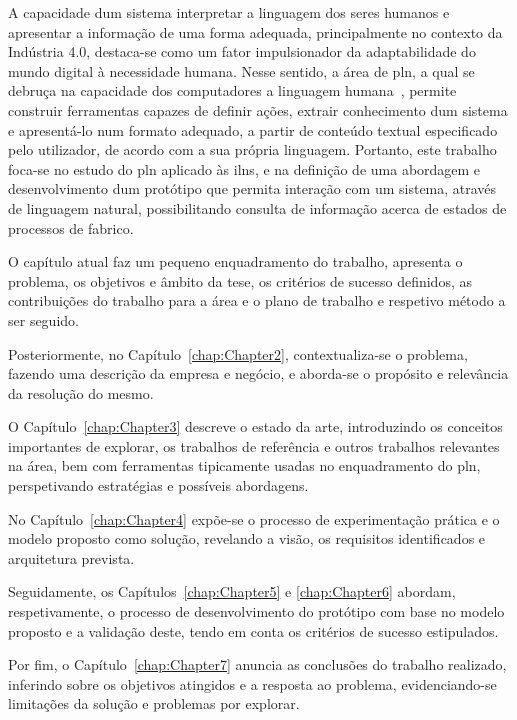 A capacidade dum sistema interpretar a linguagem dos seres humanos e apresentar a informação de uma forma adequada, principalmente no contexto da Indústria 4.0, destaca-se como um fator impulsionador da adaptabilidade do mundo digital à necessidade humana. Nesse sentido, a área de \gls{pln}, a qual se debruça na capacidade dos computadores  a linguagem humana~\parencite[p.1]{applied_natural_language_processing_with_python}, permite construir ferramentas capazes de definir ações, extrair conhecimento dum sistema e apresentá-lo num formato adequado, a partir de conteúdo textual especificado pelo utilizador, de acordo com a sua própria linguagem. Portanto, este trabalho foca-se no estudo do \gls{pln} aplicado às \glspl{iln}, e na definição de uma abordagem e desenvolvimento dum protótipo que permita interação com um sistema, através de linguagem natural, possibilitando consulta de informação acerca de estados de processos de fabrico.

O capítulo atual faz um pequeno enquadramento do trabalho, apresenta o problema, os objetivos e âmbito da tese, os critérios de sucesso definidos, as contribuições do trabalho para a área e o plano de trabalho e respetivo método a ser seguido. 

Posteriormente, no Capítulo~\ref{chap:Chapter2}, contextualiza-se o problema, fazendo uma descrição da empresa e negócio, e aborda-se o propósito e relevância da resolução do mesmo. 

O Capítulo~\ref{chap:Chapter3} descreve o estado da arte, introduzindo os conceitos importantes de explorar, os trabalhos de referência e outros trabalhos relevantes na área, bem com ferramentas tipicamente usadas no enquadramento do \gls{pln}, perspetivando estratégias e possíveis abordagens.

No Capítulo~\ref{chap:Chapter4} expõe-se o processo de experimentação prática e o modelo proposto como solução, revelando a visão, os requisitos identificados e arquitetura prevista. 

Seguidamente, os Capítulos~\ref{chap:Chapter5} e \ref{chap:Chapter6} abordam, respetivamente, o processo de desenvolvimento do protótipo com base no modelo proposto e a validação deste, tendo em conta os critérios de sucesso estipulados. 

Por fim, o Capítulo~\ref{chap:Chapter7} anuncia as conclusões do trabalho realizado, inferindo sobre os objetivos atingidos e a resposta ao problema, evidenciando-se limitações da solução e problemas por explorar.

